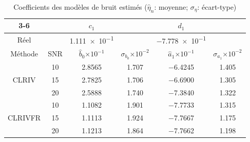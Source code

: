 \documentclass{style/presentation}
\begin{document}
\begin{frame}
    \begin{table}[!htbp]
        \caption{Coefficients des modèles de bruit estimés ($\hat{\eta}_n$: moyenne; $\sigma_\eta$: écart-type)}
        \begin{center}
            \begin{tabular}{cccccc}
                \cline{3-6}
                                         &          & $c_{1}$                             &                                        & $d_{1}$                             &                                        \\\hline\hline
                Réel                     &          & \num{1.111e-1}                      &                                        & \num{-7.778e-1}                     &                                        \\\hline
                Méthode                  & SNR      & $\hat{b}_{0}${\tiny$\times10^{-1}$} & $\sigma_{b_{0}}${\tiny$\times10^{-2}$} & $\hat{a}_{1}${\tiny$\times10^{-1}$} & $\sigma_{a_{1}}${\tiny$\times10^{-2}$} \\\hline
                \multirow{3}{*}{CLRIV}   & \num{10} & \num{2.8565}                        & \num{1.707}                            & \num{-6.4245}                       & \num{1.405}                            \\
                                         & \num{15} & \num{2.7825}                        & \num{1.706}                            & \num{-6.6900}                       & \num{1.305}                            \\
                                         & \num{20} & \num{2.5888}                        & \num{1.740}                            & \num{-7.3840}                       & \num{1.322}                            \\
                \hline
                \multirow{3}{*}{CLRIVFR} & \num{10} & \num{1.1082}                        & \num{1.901}                            & \num{-7.7733}                       & \num{1.315}                            \\
                                         & \num{15} & \num{1.1113}                        & \num{1.924}                            & \num{-7.7667}                       & \num{1.175}                            \\
                                         & \num{20} & \num{1.1213}                        & \num{1.864}                            & \num{-7.7662}                       & \num{1.198}                            \\
                \hline
            \end{tabular}
        \end{center}
    \end{table}
\end{frame}
\end{document}
